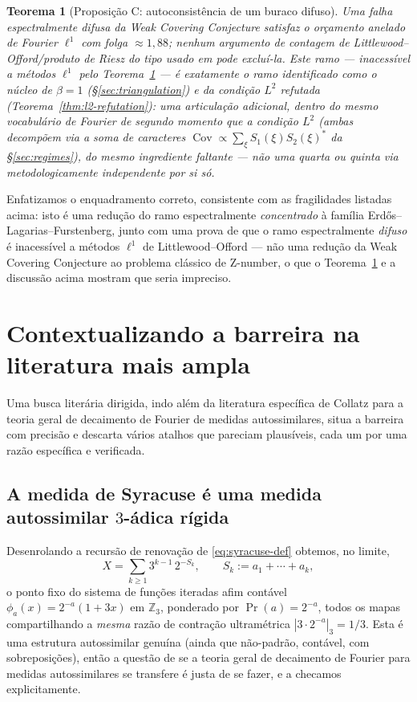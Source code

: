 \documentclass[11pt]{article}
\newtheorem{theorem}{Teorema}[section]
\theoremstyle{definition}
\theoremstyle{remark}
\DeclareMathOperator{\Cov}{Cov}
\begin{document}
\begin{theorem}[Proposição C: autoconsistência de um buraco
difuso]\label{thm:propC}
Uma falha espectralmente difusa da Weak Covering Conjecture satisfaz o
orçamento anelado de Fourier $\ell^1$ com folga $\approx 1{,}88$;
nenhum argumento de contagem de Littlewood--Offord/produto de Riesz do
tipo usado em \cite{Tao2011} pode excluí-la. Este ramo --- inacessível
a métodos $\ell^1$ pelo Teorema~\ref{thm:propC} --- é exatamente o
ramo identificado como o núcleo de $\beta=1$
(\S\ref{sec:triangulation}) e da condição $L^2$ refutada
(Teorema~\ref{thm:l2-refutation}): uma articulação adicional, dentro
do mesmo vocabulário de Fourier de segundo momento que a condição
$L^2$ (ambas decompõem via a soma de caracteres
$\Cov\propto\sum_\xi S_1(\xi)S_2(\xi)^\ast$ da \S\ref{sec:regimes}), do
mesmo ingrediente faltante --- não uma quarta ou quinta via
metodologicamente independente por si só.
\end{theorem}

Enfatizamos o enquadramento correto, consistente com as fragilidades
listadas acima: isto é uma redução do ramo espectralmente
\emph{concentrado} à família Erdős--Lagarias--Furstenberg, junto com
uma prova de que o ramo espectralmente \emph{difuso} é inacessível a
métodos $\ell^1$ de Littlewood--Offord --- não uma redução da Weak
Covering Conjecture ao problema clássico de Z-number, o que o
Teorema~\ref{thm:propC} e a discussão acima mostram que seria
impreciso.

\section{Contextualizando a barreira na literatura mais ampla}
\label{sec:context}

Uma busca literária dirigida, indo além da literatura específica de
Collatz para a teoria geral de decaimento de Fourier de medidas
autossimilares, situa a barreira com precisão e descarta vários atalhos
que pareciam plausíveis, cada um por uma razão específica e verificada.

\subsection{A medida de Syracuse é uma medida autossimilar $3$-ádica
rígida}

Desenrolando a recursão de renovação de \eqref{eq:syracuse-def} obtemos,
no limite,
\begin{equation}\label{eq:X-selfsimilar}
  X = \sum_{k\ge1} 3^{k-1}\, 2^{-S_k}, \qquad S_k:=a_1+\cdots+a_k,
\end{equation}
o ponto fixo do sistema de funções iteradas afim contável
$\phi_a(x) = 2^{-a}(1+3x)$ em $\mathbb{Z}_3$, ponderado por
$\Pr(a)=2^{-a}$, todos os mapas compartilhando a \emph{mesma} razão de
contração ultramétrica $|3\cdot2^{-a}|_3 = 1/3$. Esta é uma estrutura
autossimilar genuína (ainda que não-padrão, contável, com
sobreposições), então a questão de se a teoria geral de decaimento de
Fourier para medidas autossimilares \cite{BakerBanaji2026,Bremont,
LiSahlsten2022} se transfere é justa de se fazer, e a checamos
explicitamente.
\end{document}
